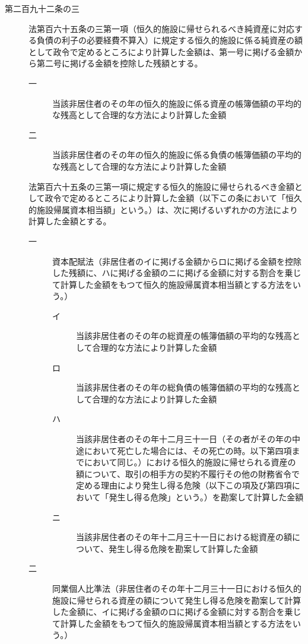 \documentclass[twocolumn,a4j,10pt]{ltjtarticle}
\begin{document}
\begin{description}
\item[第二百九十二条の三]法第百六十五条の三第一項（恒久的施設に帰せられるべき純資産に対応する負債の利子の必要経費不算入）に規定する恒久的施設に係る純資産の額として政令で定めるところにより計算した金額は、第一号に掲げる金額から第二号に掲げる金額を控除した残額とする。
\begin{description}
\item[一]当該非居住者のその年の恒久的施設に係る資産の帳簿価額の平均的な残高として合理的な方法により計算した金額
\item[二]当該非居住者のその年の恒久的施設に係る負債の帳簿価額の平均的な残高として合理的な方法により計算した金額
\end{description}
\item[]法第百六十五条の三第一項に規定する恒久的施設に帰せられるべき金額として政令で定めるところにより計算した金額（以下この条において「恒久的施設帰属資本相当額」という。）は、次に掲げるいずれかの方法により計算した金額とする。
\begin{description}
\item[一]資本配賦法（非居住者のイに掲げる金額からロに掲げる金額を控除した残額に、ハに掲げる金額のニに掲げる金額に対する割合を乗じて計算した金額をもつて恒久的施設帰属資本相当額とする方法をいう。）
\begin{description}
\item[イ]当該非居住者のその年の総資産の帳簿価額の平均的な残高として合理的な方法により計算した金額
\item[ロ]当該非居住者のその年の総負債の帳簿価額の平均的な残高として合理的な方法により計算した金額
\item[ハ]当該非居住者のその年十二月三十一日（その者がその年の中途において死亡した場合には、その死亡の時。以下第四項までにおいて同じ。）における恒久的施設に帰せられる資産の額について、取引の相手方の契約不履行その他の財務省令で定める理由により発生し得る危険（以下この項及び第四項において「発生し得る危険」という。）を勘案して計算した金額
\item[ニ]当該非居住者のその年十二月三十一日における総資産の額について、発生し得る危険を勘案して計算した金額
\end{description}
\item[二]同業個人比準法（非居住者のその年十二月三十一日における恒久的施設に帰せられる資産の額について発生し得る危険を勘案して計算した金額に、イに掲げる金額のロに掲げる金額に対する割合を乗じて計算した金額をもつて恒久的施設帰属資本相当額とする方法をいう。）
\begin{description}

\end{description}
\end{description}
\end{description}
\end{document}
